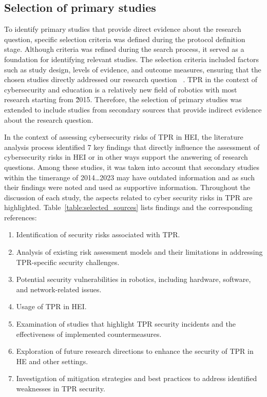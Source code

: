 \subsection{Selection of primary studies}\label{subsec:selection-of-studies}

To identify primary studies that provide direct evidence about the research question, specific selection criteria was defined during the
protocol definition stage. Although criteria was refined during the search process, it served as a foundation for identifying
relevant studies. The selection criteria included factors such as study design, levels of evidence, and outcome measures, ensuring that the
chosen studies directly addressed our research question ~\cite[10-16]{systematic_review_2004}. \ac{TPR} in the context of cybersecurity
and education is a relatively new field of robotics with most research starting from 2̃015. Therefore, the selection of primary
studies was
extended to include studies from secondary sources that provide indirect evidence about the research question.

In the context of assessing cybersecurity risks of \ac{TPR} in \ac{HEI}, the literature analysis process
identified 7 key findings that directly influence the assessment of cybersecurity risks in \ac{HEI} or in other ways support the
answering of research questions. Among
these studies, it was taken into account that secondary studies within the timerange of 2014\ldots2023 may have outdated information and
as such their findings were noted and used as supportive information. Throughout the discussion of each study, the aspects related to
cyber security risks in \ac{TPR} are highlighted. Table~\ref{table:selected_sources} lists findings and the corresponding references:

\begin{enumerate}
  \item Identification of security risks associated with \ac{TPR}. %
  \item Analysis of existing risk assessment models and their limitations in addressing \ac{TPR}-specific security challenges. %
  \item Potential security vulnerabilities in robotics, including hardware, software, and network-related issues. %
  \item Usage of \ac{TPR} in \ac{HEI}. %
  \item Examination of studies that highlight \ac{TPR} security incidents and the effectiveness of implemented countermeasures. %
  \item Exploration of future research directions to enhance the security of \ac{TPR} in \ac{HE} and other settings. %
  \item Investigation of mitigation strategies and best practices to address identified weaknesses in \ac{TPR} security. %
\end{enumerate}

